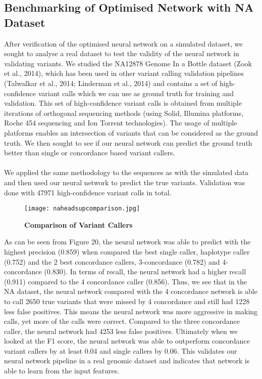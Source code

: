 \documentclass{article}
\begin{document}
\subsection{Benchmarking of Optimised Network with NA Dataset}
After verification of the optimised neural network on a simulated dataset, we sought to analyse a real dataset to test the validity of the neural network in validating variants. We studied the NA12878 Genome In a Bottle dataset (Zook et al., 2014), which has been used in other variant calling validation pipelines (Talwalkar et al., 2014; Linderman et al., 2014) and contains a set of high-confidence variant calls which we can use as ground truth for training and validation. This set of high-confidence variant calls is obtained from multiple iterations of orthogonal sequencing methods (using Solid, Illumina platforms, Roche 454 sequencing and Ion Torrent technologies). The usage of multiple platforms enables an intersection of variants that can be considered as the ground truth. We then sought to see if our neural network can predict the ground truth better than single or concordance based variant callers. \\\\We applied the same methodology to the sequences as with the simulated data and then used our neural network to predict the true variants. Validation was done with 47971 high-confidence variant calls in total.
\begin{figure}[H]
\texttt{[image: naheadsupcomparison.jpg]}
\caption{\textbf{Comparison of Variant Callers}}
\centering
\end{figure}
As can be seen from Figure 20, the neural network was able to predict with the highest precision (0.859) when compared the best single caller, haplotype caller (0.752) and the 2 best concordance callers, 3-concordance (0.782) and 4-concordance (0.830). In terms of recall, the neural network had a higher recall (0.911) compared to the 4 concordance caller (0.856). Thus, we see that in the NA dataset, the neural network compared with the 4 concordance network is able to call 2650 true variants that were missed by 4 concordance and still had 1228 less false positives. This means the neural network was more aggressive in making calls, yet more of the calls were correct. Compared to the three concordance caller, the neural network had 4253 less false positives. Ultimately when we looked at the F1 score, the neural network was able to outperform concordance variant callers by at least 0.04 and single callers by 0.06. This validates our neural network pipeline in a real genomic dataset and indicates that network is able to learn from the input features.
\newpage
\end{document}
